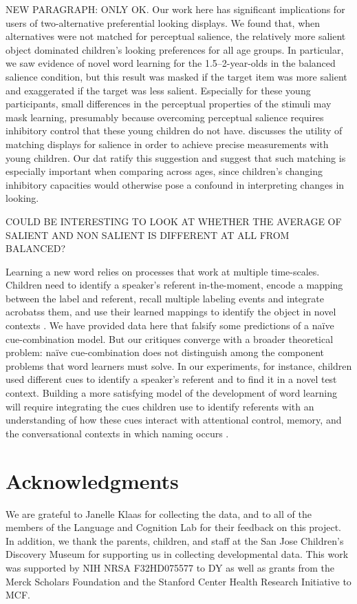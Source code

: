 \documentclass[man,floatsintext]{apa6}
\begin{document}
NEW PARAGRAPH: ONLY OK. Our work here has significant implications for users of two-alternative preferential looking displays. We found that, when alternatives were not matched for perceptual salience, the relatively more salient object dominated children's looking preferences for all age groups. In particular, we saw evidence of novel word learning for the 1.5--2-year-olds in the balanced salience condition, but this result was masked if the target item was more salient and exaggerated if the target was less salient. Especially for these young participants, small differences in the perceptual properties of the stimuli may mask learning, presumably because overcoming perceptual salience requires inhibitory control that these young children do not have.  discusses the utility of matching displays for salience in order to achieve precise measurements with young children. Our dat ratify this suggestion and suggest that such matching is especially important when comparing across ages, since children's changing inhibitory capacities would otherwise pose a confound in interpreting changes in looking.

COULD BE INTERESTING TO LOOK AT WHETHER THE AVERAGE OF SALIENT AND NON SALIENT IS DIFFERENT AT ALL FROM BALANCED?

Learning a new word relies on processes that work at multiple time-scales. Children need to identify a speaker's referent in-the-moment, encode a mapping between the label and referent, recall multiple labeling events and integrate acrobatss them, and use their learned mappings to identify the object in novel contexts \cite{Frank2009a,McMurray2012, Yu2012b}. We have provided data here that falsify some predictions of a na\"ive cue-combination model. But our critiques converge with a broader theoretical problem: na\"{i}ve cue-combination does not distinguish among the component problems that word learners must solve. In our experiments, for instance, children used different cues to identify a speaker's referent and to find it in a novel test context. Building a more satisfying model of the development of word learning will require integrating the cues children use to identify referents with an understanding of how these cues interact with attentional control, memory, and the conversational contexts in which naming occurs \cite{Frank2013a, Yurovsky2013c}.

\section{Acknowledgments}

We are grateful to Janelle Klaas for collecting the data, and to  all of the members of the Language and Cognition Lab for their feedback on this project. In addition, we thank the parents, children, and staff at the San Jose Children's Discovery Museum for supporting us in collecting developmental data. This work was supported by NIH NRSA F32HD075577 to DY as well as grants from the Merck Scholars Foundation and the Stanford Center Health Research Initiative to MCF.



\end{document}
